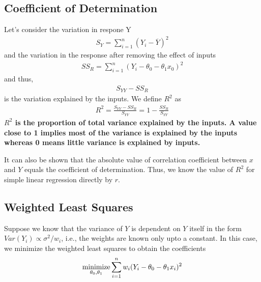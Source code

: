 \documentclass[../probability-notes.tex]{subfiles}
\begin{document}
    \subsection{Coefficient of Determination}
    Let's consider the variation in respone Y
    \begin{align*}
        S_{Y} = \sum_{i=1}^{n} (Y_{i} - \overline{Y})^{2}
    \end{align*}
    and the variation in the response after removing the effect of inputs
    \begin{align*}
        SS_{R} = \sum_{i=1}^{n} (Y_{i} - \theta_{0} - \theta_{1}x_{0})^{2}
    \end{align*}
    and thus,
    \begin{align*}
        S_{YY} - SS_{R}
    \end{align*}
    is the variation explained by the inputs. We define $R^{2}$ as
    \begin{align*}
        R^{2} = \frac{S_{YY} - SS_{R}}{S_{YY}} = 1 - \frac{SS_{R}}{S_{YY}}
    \end{align*}
    \textbf{$R^{2}$ is the proportion of total variance explained by the inputs. A value close to 1 implies most of the variance is explained by the inputs whereas 0 means little variance is explained by inputs.}\newline

    It can also be shown that the absolute value of correlation coefficient between $x$ and $Y$ equals the coefficient of determination. Thus, we know the value of $R^{2}$ for simple linear regression directly by $r$.


    \subsection{Weighted Least Squares}
    Suppose we know that the variance of $Y$ is dependent on $Y$ itself in the form $Var(Y_{i}) \propto \sigma^{2}/w_{i}$, i.e., the weights are known only upto a constant. In this case, we minimize the weighted least squares to obtain the coefficients
    \begin{align*}
        \operatorname*{minimize}_{\theta_{0}, \theta_{1}} \sum_{i=1}^{n} w_{i}(Y_{i} - \theta_{0} - \theta_{1}x_{i})^{2}
    \end{align*}
\end{document}
